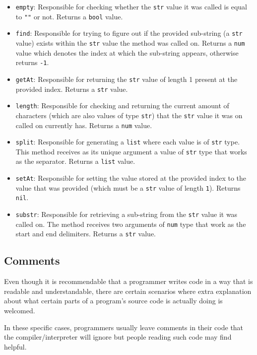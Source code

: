 \begin{itemize}
    \begin{itemize}
        \item \texttt{empty}: Responsible for checking whether the \texttt{str} value it was called is equal to \texttt{""} or not. Returns a \texttt{bool} value.
        \item \texttt{find}: Responsible for trying to figure out if the provided sub-string (a \texttt{str} value) exists within the \texttt{str} value the method was called on. Returns a \texttt{num} value which denotes the index at which the sub-string appears, otherwise returns \texttt{-1}. 
        \item \texttt{getAt}: Responsible for returning the \texttt{str} value of length 1 present at the provided index. Returns a \texttt{str} value.
        \item \texttt{length}: Responsible for checking and returning the current amount of characters (which are also values of type \texttt{str}) that the \texttt{str} value it was on called on currently has. Returns a \texttt{num} value.
        \item \texttt{split}: Responsible for generating a \texttt{list} where each value is of \texttt{str} type. This method receives as its unique argument a value of \texttt{str} type that works as the separator. Returns a \texttt{list} value.
        \item \texttt{setAt}: Responsible for setting the value stored at the provided index to the value that was provided (which must be a \texttt{str} value of length \texttt{1}). Returns \texttt{nil}.
        \item \texttt{substr}: Responsible for retrieving a sub-string from the \texttt{str} value it was called on. The method receives two arguments of \texttt{num} type that work as the start and end delimiters. Returns a \texttt{str} value.
    \end{itemize}

\end{itemize}

\subsection{Comments}
Even though it is recommendable that a programmer writes code in a way that is readable and understandable, there are certain scenarios where extra explanation about what certain parts of a program's source code is actually doing is welcomed.

In these specific cases, programmers usually leave comments in their code that the compiler/interpreter will ignore but people reading such code may find helpful.

